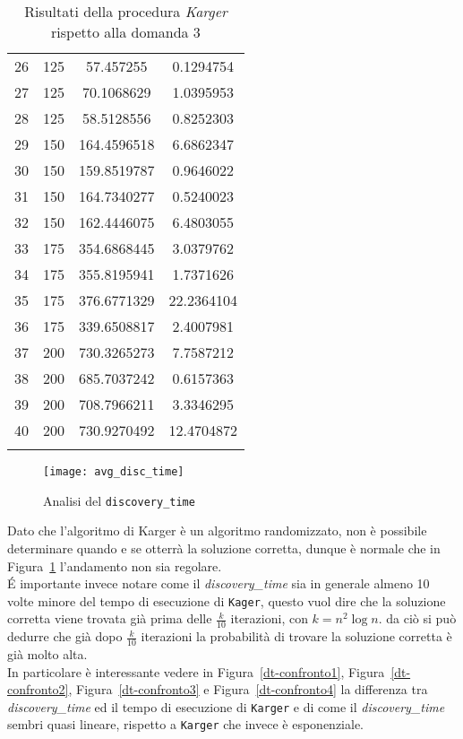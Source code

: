 \begin{center}
\begin{longtable}{|c|c|c|c|}
		26 & 125 & 57.457255 & 0.1294754 \\		
		27 & 125 & 70.1068629 & 1.0395953 \\		 
		28 & 125 & 58.5128556 & 0.8252303 \\		 
		29 & 150 & 164.4596518 & 6.6862347 \\	  
		30 & 150 & 159.8519787 & 0.9646022 \\	    
		31 & 150 & 164.7340277 & 0.5240023 \\		 
		32 & 150 & 162.4446075 & 6.4803055 \\		 
		33 & 175 & 354.6868445 & 3.0379762 \\		 
		34 & 175 & 355.8195941 & 1.7371626 \\	   	
		35 & 175 & 376.6771329 & 22.2364104 \\	  	 
		36 & 175 & 339.6508817 & 2.4007981 \\	 
		37 & 200 & 730.3265273 & 7.7587212 \\		 
		38 & 200 & 685.7037242 & 0.6157363 \\	  
		39 & 200 & 708.7966211 & 3.3346295 \\	  
		40 & 200 & 730.9270492 & 12.4704872 \\	
		\hline
		\caption{Risultati della procedura \textit{Karger} rispetto alla domanda 3}
		\label{dt-results}
	\end{longtable}
\end{center}\vspace{-40pt}

\begin{figure}[H]
	\centering
	\texttt{[image: avg\_disc\_time]}
	\caption{Analisi del \texttt{discovery\_time}}
	\label{dt-confronto}
\end{figure}

Dato che l'algoritmo di Karger è un algoritmo randomizzato, non è possibile determinare quando e se otterrà la soluzione corretta, dunque è normale che in Figura~\ref{dt-confronto} l'andamento non sia regolare.\\
\'E importante invece notare come il \textit{discovery\_time} sia in generale almeno 10 volte minore del tempo di esecuzione di \texttt{Kager}, questo vuol dire che la soluzione corretta viene trovata già prima delle $\frac{k}{10}$ iterazioni, con $k = n^2 \log n$. da ciò si può dedurre che già dopo $\frac{k}{10}$ iterazioni la probabilità di trovare la soluzione corretta è già molto alta.\\
In particolare è interessante vedere in Figura~\ref{dt-confronto1}, Figura~\ref{dt-confronto2}, Figura~\ref{dt-confronto3} e Figura~\ref{dt-confronto4} la differenza tra \textit{discovery\_time} ed il tempo di esecuzione di \texttt{Karger} e di come il \textit{discovery\_time} sembri quasi lineare, rispetto a \texttt{Karger} che invece è esponenziale.

